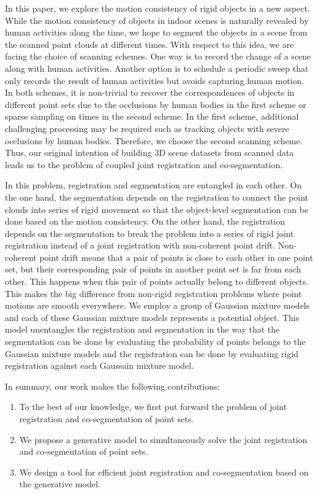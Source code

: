 In this paper, we explore the motion consistency of rigid objects in a new aspect.
While the motion consistency of objects in indoor scenes is naturally revealed by human activities along the time, we hope to segment the objects in a scene from the scanned point clouds at different times. With respect to this idea, we are facing the choice of scanning schemes. One way is to record the change of a scene along with human activities. Another option is to schedule a periodic sweep that only records the result of human activities but avoids capturing human motion. 
In both schemes, it is non-trivial to recover the correspondences of objects in different point sets due to the occlusions by human bodies in the first scheme or sparse sampling on times in the second scheme. In the first scheme, additional challenging processing may be required such as tracking objects with severe occlusions by human bodies. Therefore, we choose the second scanning scheme. 
Thus, our original intention of building 3D scene datasets from scanned data leads us to the problem of coupled joint registration and co-segmentation.

In this problem, registration and segmentation are entangled in each other. On the one hand, the segmentation depends on the registration to connect the point clouds into series of rigid movement so that the object-level segmentation can be done based on the motion consistency. On the other hand, the registration depends on the segmentation to break the problem into a series of rigid joint registration instead of a joint registration with non-coherent point drift. 
Non-coherent point drift means that a pair of points is close to each other in one point set, but their corresponding pair of points in another point set is far from each other. 
This happens when this pair of points actually belong to different objects.
%
This makes the big difference from non-rigid registration problems where point motions are smooth everywhere.
%
We employ a group of Gaussian mixture models and each of these Gaussian mixture models represents a potential object. 
This model unentangles the registration and segmentation in the way that the segmentation can be done by evaluating the probability of points belongs to the Gaussian mixture models and the registration can be done by evaluating rigid registration against each Gaussain mixture model.

In summary, our work makes the following contributions: 
\begin{enumerate}
	\item To the best of our knowledge, we first put forward the problem of joint registration and co-segmentation of point sets.
	
	\item We propose a generative model to simultaneously solve the joint registration and co-segmentation of point sets.
	
	\item We design a tool for efficient joint registration and co-segmentation based on the generative model. 
\end{enumerate}